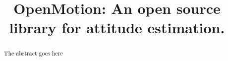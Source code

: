 \documentclass[twocolumn]{bmcart}
\begin{document}
\begin{frontmatter}

\begin{fmbox}


\author[
   addressref={aff1},                   %
   corref={aff1},     
   noteref={n1},                        %
   email={nizar.ouarti@ipal.cnrs.fr}   %
]{ }
\author[
   addressref={aff1},   corref={aff1},  
   email={braud.thomas@ipal.cnrs.fr}
]{ }
\author[
   addressref={aff1},   corref={aff1},  
   email={vivien.billaud@ipal.cnrs.fr}
]{ }



\address[id=aff1]{%
  , %
  }


\end{fmbox}%

 \title{OpenMotion: An open source library for attitude estimation.} 

\maketitle







\begin{abstractbox}

\begin{abstract} %

The abstract goes here
\end{abstract}


\begin{keyword}
\end{keyword}

\end{abstractbox}


\end{frontmatter}
\end{document}

